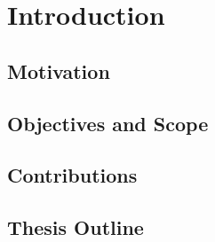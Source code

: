 %
\chapter{Introduction}
\label{ch:introduction}

\section{Motivation}
\label{sec:motivation}

\section{Objectives and Scope}
\label{sec:objectives}
%

\section{Contributions}
\label{sec:contributions}

\section{Thesis Outline}
\label{sec:outline}

